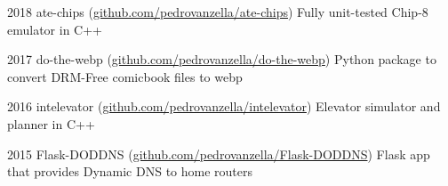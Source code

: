 \documentclass{tccv}
\begin{document}
    \begin{yearlist}

    \item{2018}
      {ate-chips \newline (\href{https://github.com/pedrovanzella/ate-chips}{github.com/pedrovanzella/ate-chips})}
      {Fully unit-tested Chip-8 emulator in C++}

    \item{2017}
      {do-the-webp \newline (\href{https://github.com/pedrovanzella/do-the-webp}{github.com/pedrovanzella/do-the-webp})}
      {Python package to convert DRM-Free comicbook files to webp}

    \item{2016}
      {intelevator \newline (\href{https://github.com/vantas/intelevator}{github.com/pedrovanzella/intelevator})}
      {Elevator simulator and planner in C++}
      
    \item{2015}
      {Flask-DODDNS \newline (\href{https://github.com/pedrovanzella/Flask-DODDNS}{github.com/pedrovanzella/Flask-DODDNS})}
      {Flask app that provides Dynamic DNS to home routers}

    \end{yearlist}
\end{document}

